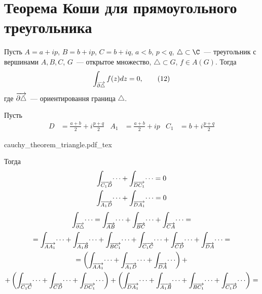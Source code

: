 \documentclass[main]{subfiles}
\begin{document}
\section{Теорема Коши для прямоугольного треугольника}
\begin{theorem}
    Пусть $A = a + ip$, $B = b + ip$, $C = b + iq$, $a < b$, $p < q$, $\triangle \subset \C$~--- треугольник с вершинами $A,B,C$, $G$~--- открытое множество, $\triangle \subset G$, $f \in A(G)$.
    Тогда
    \[\AnClOrInt[\AnClOrCurve[\partial \triangle]] f(z) dz = 0, \tag{12}\]
    где $\AnClOrCurve[\partial \triangle]$~--- ориентировання граница $\triangle$.
\end{theorem}
\begin{longProof}
    Пусть
    \begin{align*}
        D & = \frac{a + b}{2} + i \frac{p + q}{2} & A_1 & = \frac{a + b}{2} + ip & C_1 & = b + i \frac{p + q}{2}
    \end{align*}
    \begin{center}
        {cauchy_theorem_triangle.pdf_tex}
    \end{center}
    Тогда
    \begin{gather*}
        \AnClOrInt[\AnClOrCurve[C_1 D]] \dotsi + \AnClOrInt[\AnClOrCurve[D C_1]] \dotsi = 0 \\
        \AnClOrInt[\AnClOrCurve[A_1 D]] \dotsi + \AnClOrInt[\AnClOrCurve[D A_1]] \dotsi = 0
    \end{gather*}
    \begin{multline*}
        \AnClOrInt[\AnClOrCurve[\partial \triangle]] \dotsi = \AnClOrInt[\AnClOrCurve[AB]] \dotsi + \AnClOrInt[\AnClOrCurve[BC]] \dotsi + \AnClOrInt[\AnClOrCurve[CA]] \dotsi = \\
        = \AnClOrInt[\AnClOrCurve[AA_1]] \dotsi + \AnClOrInt[\AnClOrCurve[A_1 B]] \dotsi + \AnClOrInt[\AnClOrCurve[BC_1]] \dotsi + \AnClOrInt[\AnClOrCurve[C_1 C]] \dotsi + \AnClOrInt[\AnClOrCurve[CD]] \dotsi + \AnClOrInt[\AnClOrCurve[DA]] \dotsi = \\
        = \left( \AnClOrInt[\AnClOrCurve[AA_1]] \dotsi + \AnClOrInt[\AnClOrCurve[A_1 D]] \dotsi + \AnClOrInt[\AnClOrCurve[DA]] \dotsi \right) + \\
        + \left( \AnClOrInt[\AnClOrCurve[C_1 C]] \dotsi + \AnClOrInt[\AnClOrCurve[CD]] \dotsi + \AnClOrInt[\AnClOrCurve[DC_1]] \dotsi\right) + \left( \AnClOrInt[\AnClOrCurve[DA_1]] \dotsi + \AnClOrInt[\AnClOrCurve[A_1 B]] \dotsi + \AnClOrInt[\AnClOrCurve[BC_1]] \dotsi + \AnClOrInt[\AnClOrCurve[C_1 D]] \dotsi\right) = \\

\end{multline*}
\end{longProof}
\end{document}
